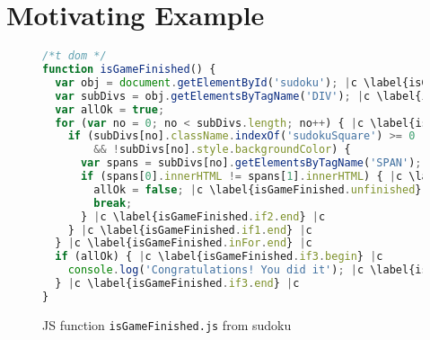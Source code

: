 \documentclass[sigconf]{acmart}
\begin{document}
\section{Motivating Example}
\label{sec.example}

\begin{figure}[t]
  \begin{lstlisting}[style=htmlcssjs,language=JavaScript]
/*t dom */
function isGameFinished() {
  var obj = document.getElementById('sudoku'); |c \label{isGameFinished.getSudoku} |c
  var subDivs = obj.getElementsByTagName('DIV'); |c \label{isGameFinished.getDivs} |c
  var allOk = true;
  for (var no = 0; no < subDivs.length; no++) { |c \label{isGameFinished.inFor.begin} |c
    if (subDivs[no].className.indexOf('sudokuSquare') >= 0 |c \label{isGameFinished.if1.begin} |c 
        && !subDivs[no].style.backgroundColor) { 
      var spans = subDivs[no].getElementsByTagName('SPAN');
      if (spans[0].innerHTML != spans[1].innerHTML) { |c \label{isGameFinished.if2.begin} |c
        allOk = false; |c \label{isGameFinished.unfinished} |c
        break;
      } |c \label{isGameFinished.if2.end} |c
    } |c \label{isGameFinished.if1.end} |c
  } |c \label{isGameFinished.inFor.end} |c
  if (allOk) { |c \label{isGameFinished.if3.begin} |c 
    console.log('Congratulations! You did it'); |c \label{isGameFinished.finished} |c
  } |c \label{isGameFinished.if3.end} |c
}
\end{lstlisting}
  \caption{JS function \texttt{isGameFinished.js} from sudoku}
  \label{code.newGame}
\end{figure}
\end{document}
